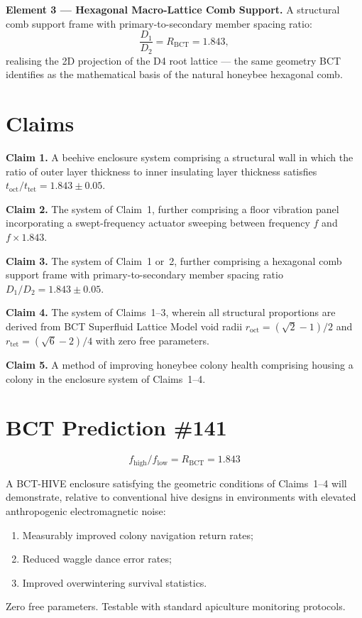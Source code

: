 \documentclass[12pt,twocolumn]{article}
\begin{document}
\textbf{Element 3 --- Hexagonal Macro-Lattice Comb Support.}
A structural comb support frame with primary-to-secondary member
spacing ratio:
\begin{equation}
\frac{D_1}{D_2} = R_\mathrm{BCT} = 1.843,
\end{equation}
realising the 2D projection of the D4 root lattice --- the same
geometry BCT identifies as the mathematical basis of the natural
honeybee hexagonal comb.

\section{Claims}

\textbf{Claim 1.} A beehive enclosure system comprising a structural
wall in which the ratio of outer layer thickness to inner insulating
layer thickness satisfies $t_\mathrm{oct}/t_\mathrm{tet}=1.843\pm0.05$.

\textbf{Claim 2.} The system of Claim~1, further comprising a
floor vibration panel incorporating a swept-frequency actuator
sweeping between frequency $f$ and $f\times1.843$.

\textbf{Claim 3.} The system of Claim~1 or~2, further comprising
a hexagonal comb support frame with primary-to-secondary member
spacing ratio $D_1/D_2=1.843\pm0.05$.

\textbf{Claim 4.} The system of Claims~1--3, wherein all structural
proportions are derived from BCT Superfluid Lattice Model void
radii $r_\mathrm{oct}=(\sqrt{2}-1)/2$ and
$r_\mathrm{tet}=(\sqrt{6}-2)/4$ with zero free parameters.

\textbf{Claim 5.} A method of improving honeybee colony health
comprising housing a colony in the enclosure system of Claims~1--4.

\section{BCT Prediction \#141}

\begin{equation}
\boxed{f_\mathrm{high}/f_\mathrm{low} = R_\mathrm{BCT} = 1.843}
\end{equation}

A BCT-HIVE enclosure satisfying the geometric conditions of
Claims~1--4 will demonstrate, relative to conventional hive designs
in environments with elevated anthropogenic electromagnetic noise:
\begin{enumerate}
\item Measurably improved colony navigation return rates;
\item Reduced waggle dance error rates;
\item Improved overwintering survival statistics.
\end{enumerate}
Zero free parameters. Testable with standard apiculture monitoring
protocols.
\end{document}

